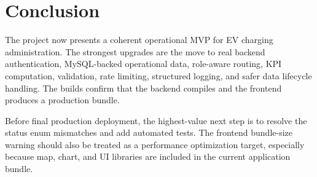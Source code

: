 \documentclass[12pt,a4paper]{report}
\begin{document}
\chapter{Conclusion}

The project now presents a coherent operational MVP for EV charging administration. The strongest upgrades are the move to real backend authentication, MySQL-backed operational data, role-aware routing, KPI computation, validation, rate limiting, structured logging, and safer data lifecycle handling. The builds confirm that the backend compiles and the frontend produces a production bundle.

Before final production deployment, the highest-value next step is to resolve the status enum mismatches and add automated tests. The frontend bundle-size warning should also be treated as a performance optimization target, especially because map, chart, and UI libraries are included in the current application bundle.
\end{document}
